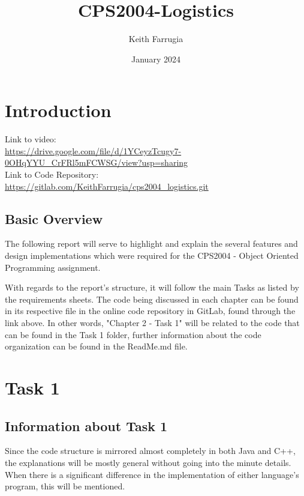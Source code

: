 \documentclass[12pt, a4paper]{report}
\title{CPS2004-Logistics}
\author{Keith Farrugia}
\date{January 2024}
\begin{document}
\maketitle
\newpage
\tableofcontents
\newpage

\newpage

\chapter{Introduction}
Link to video: \\ 
\url{https://drive.google.com/file/d/1YCeyzTcugy7-0OHqYYU_CrFRl5mFCWSG/view?usp=sharing}\\
Link to Code Repository: \\
\url{https://gitlab.com/KeithFarrugia/cps2004_logistics.git}\\
\section{Basic Overview}
The following report will serve to highlight and explain the several features and design implementations which were required for the CPS2004 - Object Oriented Programming assignment. 

With regards to the report's structure, it will follow the main Tasks as listed by the requirements sheets. The code being discussed in each chapter can be found in its respective file in the online code repository in GitLab, found through the link above. In other words, "Chapter 2 - Task 1" will be related to the code that can be found in the Task 1 folder, further information about the code organization can be found in the ReadMe.md file.

\chapter{Task 1}
\section{Information about Task 1}
Since the code structure is mirrored almost completely in both Java and C++, the explanations will be mostly general without going into the minute details. When there is a significant difference in the implementation of either language's program, this will be mentioned.
\end{document}
